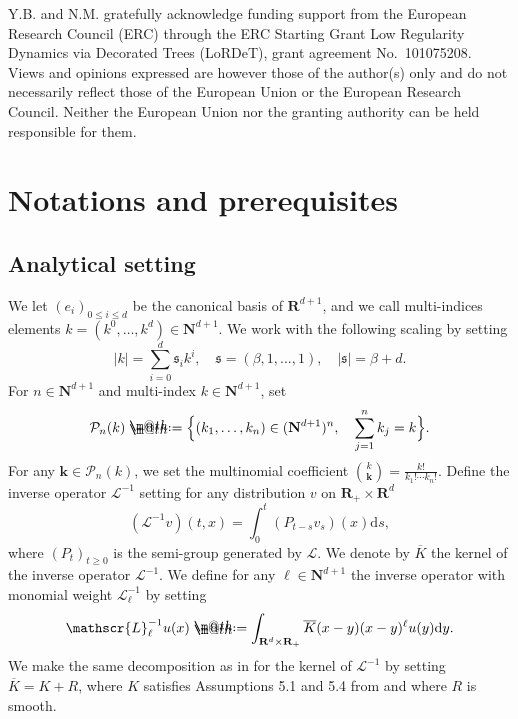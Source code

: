 \documentclass[11pt]{preprint}
\makeatletter
\newcommand{\mcL}{\mathcal{L}}
\newcommand{\mcP}{\mathcal{P}}
\newcommand*{\defeq}{\mathrel{\rlap{%
			\raisebox{0.3ex}{$\m@th\cdot$}}%
		\raisebox{-0.3ex}{$\m@th\cdot$}}%
	=}
\newcommand{\bfN}{\mathbf{N}}
\newcommand{\bfR}{\mathbf{R}}
\newcommand{\scrL}{\mathscr{L}}
\newcommand{\Linv}{\scrL^{-1}}
\newcommand{\ddd}{ \text{d} }
\makeatother
\begin{document}
	{\small
		Y.B. and N.M. gratefully acknowledge funding support from the European Research Council (ERC) through the ERC Starting Grant Low Regularity Dynamics via Decorated Trees (LoRDeT), grant agreement No.\ 101075208. Views and opinions expressed are however those of the author(s) only and do not necessarily reflect those of the European Union or the European Research Council. Neither the European Union nor the granting authority can be held responsible for them. }
	
	
	
	
	
	
	
	
	
	
	
	
	\section{Notations and prerequisites}
	\label{Sec::2}
	
	\subsection{Analytical setting} \label{subsection_analyticalsetting}
	
	We let $(e_i)_{0\leq i\leq d}$ be the canonical basis of $\bfR^{d+1}$, and we call multi-indices elements $k=(k^0,\dots,k^d)\in \bfN^{d+1}$. We work with the following scaling by setting $$|k|= \sum_{i=0}^{d}\mathfrak{s}_i k^i, \quad \mathfrak{s} = (\beta,1,...,1), \quad |\mathfrak{s}| = \beta + d. $$ For $n\in\bfN^{d+1}$ and multi-index $k\in\bfN^{d+1}$, set
	\begin{equation}
	\label{scaling}
	\mcP_n(k)\defeq \Big\{(k_1,\dots,k_n)\in (\bfN^{d+1})^n,\quad \sum_{j=1}^nk_j = k      \Big\}.
	\end{equation} 
	For any ${\bm k} \in \mcP_n(k)$, we set the multinomial coefficient 
	$ \binom{k}{\bm k } = \frac{k!}{k_1!\cdots k_n!}$.
	Define the inverse operator $\Linv$ setting for any distribution $v$ on $\bfR_+\times\bfR^d$
	$$
	(\Linv v)(t,x) = \int_0^t (P_{t-s} v_s)(x) \ddd s,
	$$
	where $(P_t)_{t\geq 0}$ is the semi-group generated by $\mcL$.
		We denote by $\overline K$ the kernel of the inverse operator $\Linv$.  We define for any $\ell\in \bfN^{d+1}$ the inverse operator with monomial weight $\scrL_\ell^{-1}$ by setting
	\begin{equation}
		\scrL_\ell^{-1} u (x) \defeq \int_{\bfR^d\times \bfR_+} \overline K(x-y)(x-y)^\ell u(y) \ddd y.
	\end{equation}
	We make the same decomposition as in \cite[Section 5]{Hai14} for the kernel of $\Linv$ by setting $\overline K=K+R$, where $K$ satisfies Assumptions 5.1 and 5.4 from \cite{Hai14} and where $R$ is smooth.
	
\end{document}
